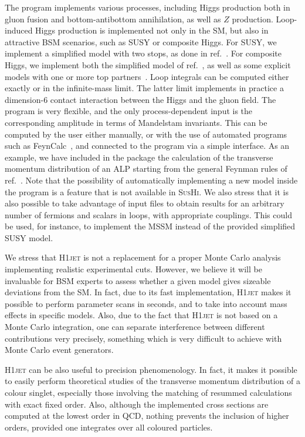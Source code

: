 \documentclass[12pt]{article}
\begin{document}
The program implements various processes, including Higgs production
both in gluon fusion and bottom-antibottom annihilation, as well as
$Z$ production. Loop-induced Higgs production is implemented not only
in the SM, but also in attractive BSM scenarios, such as SUSY or
composite Higgs. For SUSY, we implement a simplified model with two
stops, as done in ref.~\cite{Banfi:2018pki}. For composite Higgs, we
implement both the simplified model of ref.~\cite{Banfi:2013yoa}, as
well as some explicit models with one or more top
partners~\cite{Banfi:2019xai}. Loop integrals can be computed either
exactly or in the infinite-mass limit. The latter limit implements in
practice a dimension-6 contact interaction between the Higgs and the
gluon field. The program is very flexible, and the only
process-dependent input is the corresponding amplitude in terms of
Mandelstam invariants. This can be computed by the user either
manually, or with the use of automated programs such as
FeynCalc~\cite{Shtabovenko:2020gxv}, and connected to the program via
a simple interface. As an example, we have included in the package the
calculation of the transverse momentum distribution of an ALP starting
from the general Feynman rules of ref.~\cite{Brivio:2017ije}. Note
that the possibility of automatically implementing a new model inside
the program is a feature that is not available in \textsc{SusHi}. We
also stress that it is also possible to take advantage of input files
to obtain results for an arbitrary number of fermions and scalars in
loops, with appropriate couplings. This could be used, for instance, to
implement the MSSM instead of the provided simplified SUSY model.

We stress that \textsc{H1jet} is not a replacement for a proper Monte Carlo
analysis implementing realistic experimental cuts. However, we believe
it will be invaluable for BSM experts to assess whether a given model
gives sizeable deviations from the SM. In fact, due to its fast
implementation, \textsc{H1jet} makes it possible to perform parameter scans in
seconds, and to take into account mass effects in specific
models. Also, due to the fact that \textsc{H1jet} is not based on a Monte Carlo
integration, one can separate interference between different
contributions very precisely, something which is very difficult to
achieve with Monte Carlo event generators.

\textsc{H1jet} can be also useful to precision phenomenology. In fact, it makes
it possible to easily perform theoretical studies of the transverse
momentum distribution of a colour singlet, especially those involving
the matching of resummed calculations with exact fixed order. Also,
although the implemented cross sections are computed at the lowest
order in QCD, nothing prevents the inclusion of higher orders, provided one
integrates over all coloured particles. 
\end{document}
